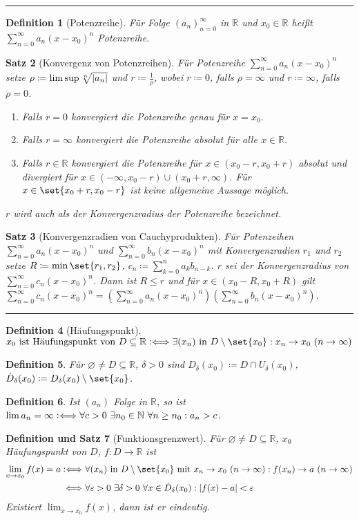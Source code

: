 \documentclass[a4paper]{article}
\newcounter{Sec}
\theoremstyle{marginbreak}
\newtheorem{definition}{Definition}[Sec]
\newtheorem{satz}[definition]{Satz}
\newtheorem{defsatz}[definition]{Definition und Satz}
\newcommand{\sep}{%
	\rule{\textwidth}{0.3pt}%
	\stepcounter{Sec}%
	}
\newcommand{\defiff}{\mathrel{\vcentcolon\Longleftrightarrow}}
\newcommand{\en}{~(n\to\infty)}
\newcommand{\series}[1][1]{\sum_{n=#1}^\infty}
\newcommand{\ps}[1][a]{\series[0]#1_n(x-x_0)^n}
\begin{document}
	\sep
	\begin{definition}[Potenzreihe]
		Für Folge $(a_n)_{n=0}^\infty$ in $\mathbb{R}$ und $x_0\in\mathbb{R}$
		heißt $\ps$ Potenzreihe.
	\end{definition}
	\begin{satz}[Konvergenz von Potenzreihen]
		Für Potenzreihe $\ps$ setze
		$\rho\coloneqq\lim\sup\sqrt[n]{\abs{a_n}}$ und $r\coloneqq\frac{1}{\rho}$,
		wobei $r\coloneqq0$, falls $\rho=\infty$ und $r\coloneqq\infty$, falls
		$\rho=0$.
		\begin{enumerate}[label=(\alph*)]
			\item Falls $r=0$ konvergiert die Potenzreihe genau für $x=x_0$.
			\item Falls $r=\infty$ konvergiert die Potenzreihe absolut für alle $x\in\mathbb{R}$.
			\item Falls $r\in\mathbb{R}$ konvergiert die Potenzreihe für $x \in (x_0 - r, x_0 + r)$
				absolut und divergiert für $x \in (-\infty, x_0-r) \cup (x_0+r, \infty)$. Für
				$x\in\set{x_0+r,x_0-r}$ ist keine allgemeine Aussage möglich.
		\end{enumerate}
		$r$ wird auch als der Konvergenzradius der Potenzreihe bezeichnet.
	\end{satz}
	\begin{satz}[Konvergenzradien von Cauchyprodukten]
		Für Potenzeihen $\ps$ und $\ps[b]$ mit Konvergenzradien $r_1$ und $r_2$
		setze $R\coloneqq\min\set{r_1,r_2}$, $c_n\coloneqq\sum_{k=0}^na_kb_{n-k}$.
		$r$ sei der Konvergenzradius von $\ps[c]$. Dann ist $R\leq r$ und für
		$x\in(x_0-R,x_0+R)$ gilt $\ps[c]=(\ps)(\ps[b])$.
	\end{satz}
	\sep
	\begin{definition}[Häufungspunkt]
		$x_0~\text{ist Häufungspunkt von}~D\subseteq\mathbb{R}
		\defiff\exists(x_n)~\text{in $D\setminus\set{x_0}$}:x_n\to x_0\en$
	\end{definition}
	\begin{definition}
		Für $\varnothing\neq D\subseteq\mathbb{R}$, $\delta>0$ sind
		$D_\delta(x_0)\coloneqq D\cap U_\delta(x_0)$, $\dot{D}_\delta(x_0)\coloneqq
		D_\delta(x_0)\setminus\set{x_0}$.
	\end{definition}
	\begin{definition}
		Ist $(a_n)$ Folge in $\mathbb{R}$, so ist
		$\lim a_n = \infty\defiff \forall c>0~\exists n_0\in\mathbb{N}~\forall n\geq n_0:a_n>c$.
	\end{definition}
	\begin{defsatz}[Funktionsgrenzwert]
		Für $\varnothing\neq D\subseteq\mathbb{R}$, $x_0$ Häufungspunkt von $D$,
		$f\colon D\to\mathbb{R}$ ist
		\begin{align*}
			\lim_{x\to x_0}f(x) = a
			\defiff&~\forall(x_n)~\text{in}~D\setminus\set{x_0}~\text{mit}~x_n\to x_0\en:f(x_n)\to a\en\\
			\Longleftrightarrow&~\forall\varepsilon>0~\exists\delta>0~\forall x\in\dot{D}_\delta(x_0):\abs{f(x)-a}<\varepsilon
		\end{align*}
		Existiert $\lim_{x\to x_0}f(x)$, dann ist er eindeutig.
	\end{defsatz}
\end{document}
